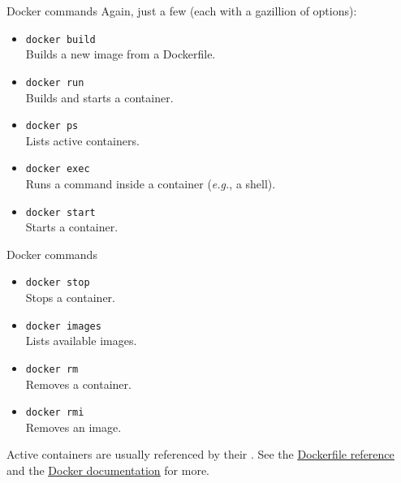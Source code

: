 \begin{frame}{Docker commands}
	Again, just a few (each with a gazillion of options):
	\begin{itemize}
		\item \texttt{docker build}\\Builds a new image from a Dockerfile.
		\item \texttt{docker run}\\Builds and starts a container.
		\item \texttt{docker ps}\\Lists active containers.
		\item \texttt{docker exec}\\Runs a command inside a container (\emph{e.g.}, a shell).
		\item \texttt{docker start}\\Starts a container.
	\end{itemize}
\end{frame}
\begin{frame}{Docker commands}
	\begin{itemize}
		\item \texttt{docker stop}\\Stops a container.
		\item \texttt{docker images}\\Lists available images.
		\item \texttt{docker rm}\\Removes a container.
		\item \texttt{docker rmi}\\Removes an image.
	\end{itemize}
	Active containers are usually referenced by their .
  \newline\newline
  See the \href{https://docs.docker.com/engine/reference/builder/}{\color{blue}\underline{Dockerfile reference}} and the \href{https://docs.docker.com/engine/reference/commandline/docker/}{\color{blue}\underline{Docker documentation}} for more.
\end{frame}
